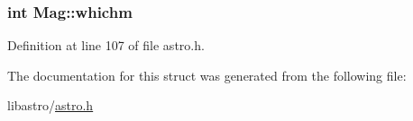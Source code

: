 \hypertarget{struct_mag_a6bd80ae4be8970271bf1e1d3b6096845}{
\subsubsection[{whichm}]{\setlength{\rightskip}{0pt plus 5cm}int Mag\-::whichm}}\label{struct_mag_a6bd80ae4be8970271bf1e1d3b6096845}


Definition at line 107 of file astro.\-h.



The documentation for this struct was generated from the following file\-:\begin{DoxyCompactItemize}
\item 
libastro/\hyperlink{astro_8h}{astro.\-h}\end{DoxyCompactItemize}
